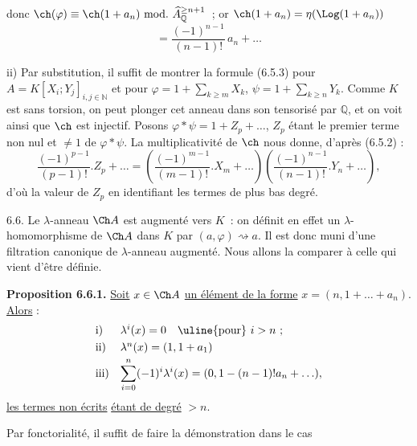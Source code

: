 
donc \(\ch(\varphi)\equiv\ch(1+a_n)\ \mathrm{mod.}\ \widehat A_{\mathbb Q}^{\ge n+1}\)~; or \(\ch(1+a_n)=\eta(\Log(1+a_n))\)
\[
  =\frac{(-1)^{n-1}}{(n-1)!}\,a_n+\ldots
\]

ii) Par substitution, il suffit de montrer la formule (6.5.3) pour \(A=K[X_i;Y_j]_{i,j\in\mathbb N}\) et pour \(\varphi=1+\sum_{k\ge m}X_k\), \(\psi=1+\sum_{k\ge n}Y_k\). Comme \(K\) est sans torsion, on peut plonger cet anneau dans son tensorisé par \(\mathbb Q\), et on voit ainsi que \(\ch\) est injectif. Posons \(\varphi*\psi=1+Z_p+\ldots\), \(Z_p\) étant le premier terme non nul et \(\neq1\) de \(\varphi*\psi\). La multiplicativité de \(\ch\) nous donne, d'après (6.5.2) :
\[
  \frac{(-1)^{p-1}}{(p-1)!}.Z_p+\ldots
  =
  \left(\frac{(-1)^{m-1}}{(m-1)!}.X_m+\ldots\right)
  \left(\frac{(-1)^{n-1}}{(n-1)!}.Y_n+\ldots\right),
\]
d'où la valeur de \(Z_p\) en identifiant les termes de plus bas degré.

6.6. Le \(\lambda\)-anneau \(\Ch A\) est augmenté vers \(K\)~: on définit en effet un \(\lambda\)-homomorphisme de \(\Ch A\) dans \(K\) par \((a,\varphi)\rightsquigarrow a\). Il est donc muni d'une filtration canonique de \(\lambda\)-anneau augmenté. Nous allons la comparer à celle qui vient d'être définie.

\textbf{Proposition 6.6.1.} \uline{Soit} \(x\in\Ch A\) \uline{un élément de la forme} \(x=(n,1+\ldots+a_n)\). \uline{Alors} :
\[
\begin{array}{ll}
\text{i)}& \lambda^i(x)=0\quad\text{\uline{pour} }i>n~;\\[0.3em]
\text{ii)}& \lambda^n(x)=(1,1+a_1)\\[0.3em]
\text{iii)}& \displaystyle\sum_{i=0}^n(-1)^i\lambda^i(x)
       =(0,1-(n-1)!a_n+\ldots),
\end{array}
\]
\uline{les termes non écrits} \uline{étant de degré} \(>n\).

Par fonctorialité, il suffit de faire la démonstration dans le cas 
